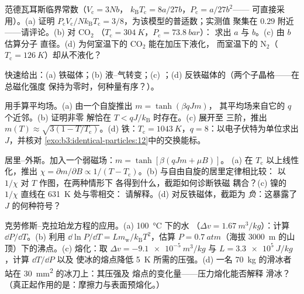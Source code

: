 \begin{exercise}[$\star$]\label{exo:b3:phase-transitions:3}
范德瓦耳斯临界常数（$V_{\text{c}} = 3Nb$，
$k_{\text{B}}T_{\text{c}} = 8a/27b$，$P_{\text{c}} = a/27b^2$——
可直接采用）。(a) 证明 $P_{\text{c}}V_{\text{c}}/Nk_{\text{B}}T_{\text{
c}} = 3/8$，为该模型的普适数；实测值
聚集在 $0.29$ 附近——请评论。(b) 对 CO$_2$
（$T_{\text{c}} = \qty{304}{K}$，$P_{\text{c}} = \qty{73.8}{bar}$）：
求出 $a$ 与 $b$。(c) 由 $b$ 估算分子
直径。(d) 为何室温下的 CO$_2$ 能在加压下液化，
而室温下的 N$_2$（$T_{\text{c}} =
\qty{126}{K}$）却从不液化？
\end{exercise}

\begin{exercise}[$\star$]\label{exo:b3:phase-transitions:4}
快速给出：(a) 铁磁体；(b)
液–气转变；(c) ；(d)
反铁磁体的（两个子晶格——在总磁化强度
保持为零时，何种量有序？）。
\end{exercise}

\begin{exercise}[$\star\star$]\label{exo:b3:phase-transitions:5}
用手算平均场。(a) 由一个自旋推出 $m = \tanh(\beta qJm)$，
其平均场来自它的 $q$ 个近邻。(b) 证明非零
解恰在 $T < qJ/k_{\text{B}}$ 时存在。(c) 展开至
三阶，推出 $m(T) \approx \sqrt{3(1 -
T/T_{\text{c}})}$。(d) 铁：$T_{\text{c}} = \qty{1043}{K}$，$q =
8$：以电子伏特为单位求出 $J$，并核对
\cref{exo:b3:identical-particles:12}中的交换能标。
\end{exercise}

\begin{exercise}[$\star\star$]\label{exo:b3:phase-transitions:6}
居里–外斯。加入一个弱磁场：$m = \tanh[\beta(qJm + \mu B)]$。
(a) 在 $T_{\text{c}}$ 以上线性化，推出 $\chi = \partial
m/\partial B \propto 1/(T - T_{\text{c}})$。(b) 与自由自旋的居里定律相比较：
以 $1/\chi$ 对 $T$ 作图，在两种情形下
各得到什么，截距如何诊断铁磁
耦合？(c) 镍的 $1/\chi$ 直线在 \qty{631}{K} 处与零相交：
请解释。(d) 对反铁磁体，截距为
\emph{负}：这暴露了 $J$ 的何种符号？
\end{exercise}

\begin{exercise}[$\star\star$]\label{exo:b3:phase-transitions:7}
克劳修斯–克拉珀龙方程的应用。(a) \qty{100}{\celsius} 下的水
（$\Delta v = \qty{1.67}{m^3/kg}$）：计算 $\dd P/\dd T$。(b)
利用 $\dd\ln P/\dd T = Lm_{\text{w}}/k_{\text{B}}T^2$，估算
$P = \qty{0.7}{atm}$（海拔 \qty{3000}{m}
的山顶）下的沸点。(c) 熔化：取 $\Delta v = \qty{-9.1e-5}{m^3/kg}$ 与
$L = \qty{3.3e5}{J/kg}$，计算 $\dd T/\dd P$ 以及
使冰的熔点降低 \qty{5}{K} 所需的压强。(d) 一名
\qty{70}{kg} 的滑冰者站在 \qty{30}{mm^2} 的冰刀上：其压强及
熔点的变化量——压力熔化能否解释
滑冰？（真正起作用的是：摩擦力与表面预熔化。）
\end{exercise}

